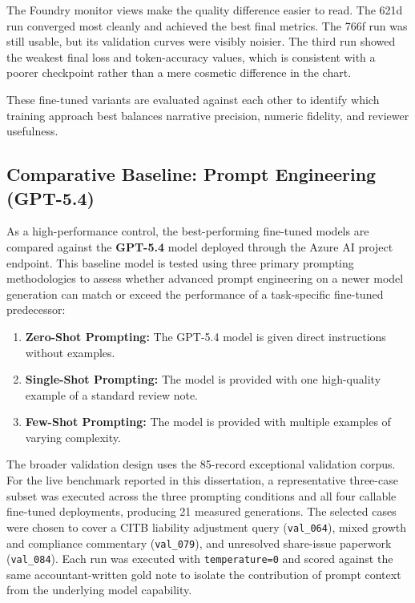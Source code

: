 The Foundry monitor views make the quality difference easier to read. The 621d run converged most cleanly and achieved the best final metrics. The 766f run was still usable, but its validation curves were visibly noisier. The third run showed the weakest final loss and token-accuracy values, which is consistent with a poorer checkpoint rather than a mere cosmetic difference in the chart.

These fine-tuned variants are evaluated against each other to identify which training approach best balances narrative precision, numeric fidelity, and reviewer usefulness.


\subsection{Comparative Baseline: Prompt Engineering (GPT-5.4)}
As a high-performance control, the best-performing fine-tuned models are compared against the \textbf{GPT-5.4} model deployed through the Azure AI project endpoint. This baseline model is tested using three primary prompting methodologies to assess whether advanced prompt engineering on a newer model generation can match or exceed the performance of a task-specific fine-tuned predecessor:
\begin{enumerate}
    \item \textbf{Zero-Shot Prompting:} The GPT-5.4 model is given direct instructions without examples.
    \item \textbf{Single-Shot Prompting:} The model is provided with one high-quality example of a standard review note.
    \item \textbf{Few-Shot Prompting:} The model is provided with multiple examples of varying complexity.
\end{enumerate}

The broader validation design uses the 85-record exceptional validation corpus. For the live benchmark reported in this dissertation, a representative three-case subset was executed across the three prompting conditions and all four callable fine-tuned deployments, producing 21 measured generations. The selected cases were chosen to cover a CITB liability adjustment query (\texttt{val\_064}), mixed growth and compliance commentary (\texttt{val\_079}), and unresolved share-issue paperwork (\texttt{val\_084}). Each run was executed with \texttt{temperature=0} and scored against the same accountant-written gold note to isolate the contribution of prompt context from the underlying model capability.

